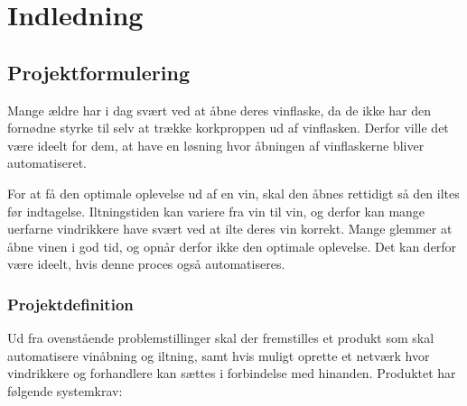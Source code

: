 \chapter{Indledning}
\section{Projektformulering}
Mange ældre har i dag svært ved at åbne deres vinflaske, da de ikke har den fornødne styrke til selv at trække korkproppen ud af vinflasken. Derfor ville det være ideelt for dem, at have en løsning hvor åbningen af vinflaskerne bliver automatiseret.

For at få den optimale oplevelse ud af en vin, skal den åbnes rettidigt så den iltes før indtagelse. Iltningstiden kan variere fra vin til vin, og derfor kan mange uerfarne vindrikkere have svært ved at ilte deres vin korrekt. Mange glemmer at åbne vinen i god tid, og opnår derfor ikke den optimale oplevelse. Det kan derfor være ideelt, hvis denne proces også automatiseres.

\subsection{Projektdefinition}
Ud fra ovenstående problemstillinger skal der fremstilles et produkt som skal automatisere vinåbning og iltning, samt hvis muligt  oprette et netværk hvor vindrikkere og forhandlere kan sættes i forbindelse med hinanden. Produktet har følgende systemkrav:

